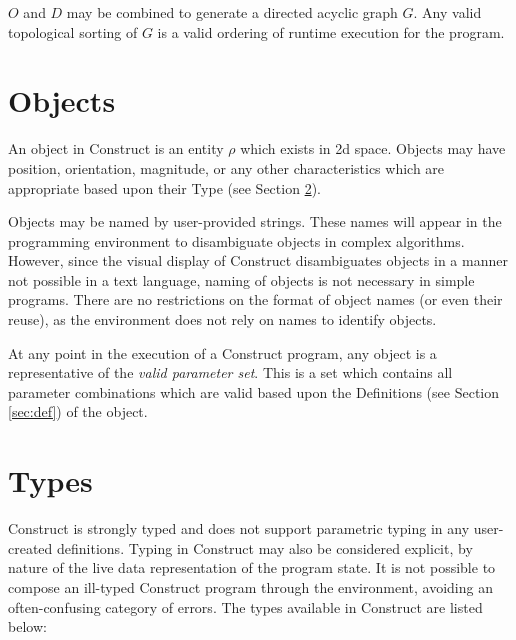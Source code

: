 \documentclass[twoside,openright,11pt]{report}
\begin{document}
$O$ and $D$ may be combined to generate a directed acyclic graph $G$. 
Any valid topological sorting of $G$ is a valid ordering of runtime execution for the program.

\section{Objects}
\label{sec:obj}

An object in Construct is an entity $\rho$ which exists in 2d space. 
Objects may have position, orientation, magnitude, or any other characteristics which are appropriate based upon their Type (see Section \ref{sec:types}). 

Objects may be named by user-provided strings. 
These names will appear in the programming environment to disambiguate objects in complex algorithms.
However, since the visual display of Construct disambiguates objects in a manner not possible in a text language, naming of objects is not necessary in simple programs.
There are no restrictions on the format of object names (or even their reuse), as the environment does not rely on names to identify objects.

At any point in the execution of a Construct program, any object is a representative of the {\it valid parameter set}. 
This is a set which contains all parameter combinations which are valid based upon the Definitions (see Section \ref{sec:def}) of the object.

\section{Types}
\label{sec:types}

Construct is strongly typed and does not support parametric typing in any user-created definitions. 
Typing in Construct may also be considered explicit, by nature of the live data representation of the program state. 
It is not possible to compose an ill-typed Construct program through the environment, avoiding an often-confusing category of errors.
The types available in Construct are listed below: \\
\end{document}
